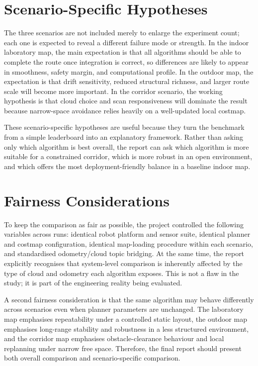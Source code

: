 \documentclass[12pt,a4paper]{report}
\begin{document}
\section{Scenario-Specific Hypotheses}
The three scenarios are not included merely to enlarge the experiment count; each one is expected to reveal a different failure mode or strength. In the indoor laboratory map, the main expectation is that all algorithms should be able to complete the route once integration is correct, so differences are likely to appear in smoothness, safety margin, and computational profile. In the outdoor map, the expectation is that drift sensitivity, reduced structural richness, and larger route scale will become more important. In the corridor scenario, the working hypothesis is that cloud choice and scan responsiveness will dominate the result because narrow-space avoidance relies heavily on a well-updated local costmap.

These scenario-specific hypotheses are useful because they turn the benchmark from a simple leaderboard into an explanatory framework. Rather than asking only which algorithm is best overall, the report can ask which algorithm is more suitable for a constrained corridor, which is more robust in an open environment, and which offers the most deployment-friendly balance in a baseline indoor map.

\section{Fairness Considerations}
To keep the comparison as fair as possible, the project controlled the following variables across runs: identical robot platform and sensor suite, identical planner and costmap configuration, identical map-loading procedure within each scenario, and standardised odometry/cloud topic bridging. At the same time, the report explicitly recognises that system-level comparison is inherently affected by the type of cloud and odometry each algorithm exposes. This is not a flaw in the study; it is part of the engineering reality being evaluated.

A second fairness consideration is that the same algorithm may behave differently across scenarios even when planner parameters are unchanged. The laboratory map emphasises repeatability under a controlled static layout, the outdoor map emphasises long-range stability and robustness in a less structured environment, and the corridor map emphasises obstacle-clearance behaviour and local replanning under narrow free space. Therefore, the final report should present both overall comparison and scenario-specific comparison.
\end{document}
